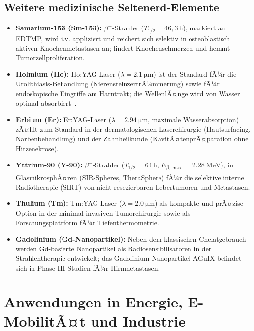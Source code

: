 ﻿\documentclass[12pt, a4paper]{report}
\theoremstyle{definition}
\theoremstyle{remark}
\begin{document}
\subsection{Weitere medizinische Seltenerd-Elemente}

\begin{itemize}
  \item \textbf{Samarium-153 (Sm-153):} $\beta^-$-Strahler ($T_{1/2}=46{,}3\,\text{h}$),
        markiert an EDTMP, wird i.v. appliziert und reichert sich selektiv in
        osteoblastisch aktiven Knochenmetastasen an; lindert Knochenschmerzen
        und hemmt Tumorzellproliferation.
  \item \textbf{Holmium (Ho):} Ho:YAG-Laser ($\lambda = \SI{2.1}{\micro\metre}$)
        ist der Standard fÃ¼r die Urolithiasis-Behandlung (NierensteinzertrÃ¼mmerung)
        sowie fÃ¼r endoskopische Eingriffe am Harntrakt; die WellenlÃ¤nge wird
        von Wasser optimal absorbiert~\cite{haxel2002}.
  \item \textbf{Erbium (Er):} Er:YAG-Laser ($\lambda = \SI{2.94}{\micro\metre}$,
        maximale Wasserabsorption) zÃ¤hlt zum Standard in der dermatologischen
        Laserchirurgie (Hautsurfacing, Narbenbehandlung) und der Zahnheilkunde
        (KavitÃ¤tenprÃ¤paration ohne Hitzenekrose).
  \item \textbf{Yttrium-90 (Y-90):} $\beta^-$-Strahler
        ($T_{1/2} = 64\,\text{h}$, $E_{\beta,\max} = \SI{2.28}{\mega\electronvolt}$),
        in GlasmikrosphÃ¤ren (SIR-Spheres\textsuperscript{\textregistered},
        TheraSphere\textsuperscript{\textregistered}) fÃ¼r die selektive interne
        Radiotherapie (SIRT) von nicht-resezierbaren Lebertumoren und Metastasen.
  \item \textbf{Thulium (Tm):} Tm:YAG-Laser ($\lambda = \SI{2.0}{\micro\metre}$)
        als kompakte und prÃ¤zise Option in der minimal-invasiven Tumorchirurgie
        sowie als Forschungsplattform fÃ¼r Tiefenthermometrie.
  \item \textbf{Gadolinium (Gd-Nanopartikel):} Neben dem klassischen
        Chelatgebrauch werden Gd-basierte Nanopartikel als Radiosensibilisatoren
        in der Strahlentherapie entwickelt; das Gadolinium-Nanopartikel AGuIX
        befindet sich in Phase-III-Studien fÃ¼r Hirnmetastasen.
\end{itemize}

\section{Anwendungen in Energie, E-MobilitÃ¤t und Industrie}
\label{ssec:re_energie}
\end{document}
